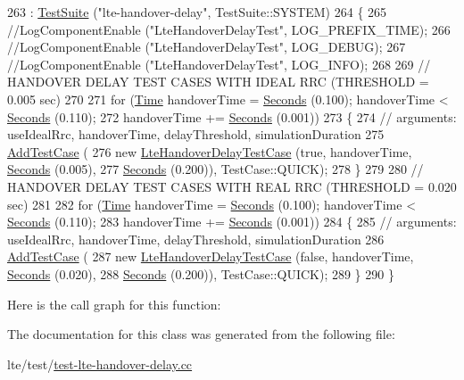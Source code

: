 \begin{DoxyCode}
263       : \hyperlink{classns3_1_1TestSuite_a904b0c40583b744d30908aeb94636d1a}{TestSuite} (\textcolor{stringliteral}{"lte-handover-delay"}, TestSuite::SYSTEM)
264   \{
265     \textcolor{comment}{//LogComponentEnable ("LteHandoverDelayTest", LOG\_PREFIX\_TIME);}
266     \textcolor{comment}{//LogComponentEnable ("LteHandoverDelayTest", LOG\_DEBUG);}
267     \textcolor{comment}{//LogComponentEnable ("LteHandoverDelayTest", LOG\_INFO);}
268 
269     \textcolor{comment}{// HANDOVER DELAY TEST CASES WITH IDEAL RRC (THRESHOLD = 0.005 sec)}
270 
271     \textcolor{keywordflow}{for} (\hyperlink{classns3_1_1Time}{Time} handoverTime = \hyperlink{group__timecivil_ga33c34b816f8ff6628e33d5c8e9713b9e}{Seconds} (0.100); handoverTime < \hyperlink{group__timecivil_ga33c34b816f8ff6628e33d5c8e9713b9e}{Seconds} (0.110);
272         handoverTime += \hyperlink{group__timecivil_ga33c34b816f8ff6628e33d5c8e9713b9e}{Seconds} (0.001))
273       \{
274         \textcolor{comment}{// arguments: useIdealRrc, handoverTime, delayThreshold, simulationDuration}
275         \hyperlink{classns3_1_1TestCase_a3718088e3eefd5d6454569d2e0ddd835}{AddTestCase} (
276             \textcolor{keyword}{new} \hyperlink{classLteHandoverDelayTestCase}{LteHandoverDelayTestCase} (\textcolor{keyword}{true}, handoverTime, 
      \hyperlink{group__timecivil_ga33c34b816f8ff6628e33d5c8e9713b9e}{Seconds} (0.005),
277                 \hyperlink{group__timecivil_ga33c34b816f8ff6628e33d5c8e9713b9e}{Seconds} (0.200)), TestCase::QUICK);
278       \}
279 
280     \textcolor{comment}{// HANDOVER DELAY TEST CASES WITH REAL RRC (THRESHOLD = 0.020 sec)}
281 
282     \textcolor{keywordflow}{for} (\hyperlink{classns3_1_1Time}{Time} handoverTime = \hyperlink{group__timecivil_ga33c34b816f8ff6628e33d5c8e9713b9e}{Seconds} (0.100); handoverTime < \hyperlink{group__timecivil_ga33c34b816f8ff6628e33d5c8e9713b9e}{Seconds} (0.110);
283         handoverTime += \hyperlink{group__timecivil_ga33c34b816f8ff6628e33d5c8e9713b9e}{Seconds} (0.001))
284       \{
285         \textcolor{comment}{// arguments: useIdealRrc, handoverTime, delayThreshold, simulationDuration}
286         \hyperlink{classns3_1_1TestCase_a3718088e3eefd5d6454569d2e0ddd835}{AddTestCase} (
287             \textcolor{keyword}{new} \hyperlink{classLteHandoverDelayTestCase}{LteHandoverDelayTestCase} (\textcolor{keyword}{false}, handoverTime, 
      \hyperlink{group__timecivil_ga33c34b816f8ff6628e33d5c8e9713b9e}{Seconds} (0.020),
288                 \hyperlink{group__timecivil_ga33c34b816f8ff6628e33d5c8e9713b9e}{Seconds} (0.200)), TestCase::QUICK);
289       \}
290   \}
\end{DoxyCode}


Here is the call graph for this function\+:




The documentation for this class was generated from the following file\+:\begin{DoxyCompactItemize}
\item 
lte/test/\hyperlink{test-lte-handover-delay_8cc}{test-\/lte-\/handover-\/delay.\+cc}\end{DoxyCompactItemize}
